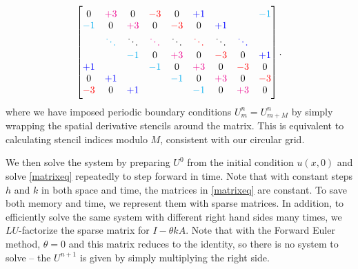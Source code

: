 \begin{equation*}
\begin{bmatrix}
0           & \color{magenta} +3      & 0           & \color{red} -3      & 0           & \color{blue} +1      &             &             & \color{cyan} -1      \\
\color{cyan} -1      & 0           & \color{magenta} +3      & 0           & \color{red} -3      & 0           & \color{blue} +1      &             &             \\
            & \color{cyan} \ddots  & \ddots      & \color{magenta} \ddots  & \ddots      & \color{red} \ddots  & \ddots      & \color{blue} \ddots  &             \\
            &             & \color{cyan} -1      & 0           & \color{magenta} +3      & 0           & \color{red} -3      & 0           & \color{blue} +1      \\
\color{blue} +1      &             &             & \color{cyan} -1      & 0           & \color{magenta} +3      & 0           & \color{red} -3      & 0           \\
0           & \color{blue} +1      &             &             & \color{cyan} -1      & 0           & \color{magenta} +3      & 0           & \color{red} -3      \\
\color{red} -3      & 0           & \color{blue} +1      &             &             & \color{cyan} -1      & 0           & \color{magenta} +3      & 0           \\
\end{bmatrix}
.
\end{equation*}
where we have imposed periodic boundary conditions $U_m^n = U_{m+M}^n$ by simply wrapping the spatial derivative stencils around the matrix.
This is equivalent to calculating stencil indices modulo $M$, consistent with our circular grid.

We then solve the system by preparing $U^0$ from the initial condition $u(x, 0)$ and solve \cref{matrixeq} repeatedly to step forward in time.
Note that with constant steps $h$ and $k$ in both space and time, the matrices in \cref{matrixeq} are constant.
To save both memory and time, we represent them with sparse matrices. \cite{scipy_sparse}
In addition, to efficiently solve the same system with different right hand sides many times, we $LU$-factorize the sparse matrix for $I - \theta k A$. \cite{scipy_sparse_lu}
Note that with the Forward Euler method, $\theta = 0$ and this matrix reduces to the identity, so there is no system to solve -- the $U^{n+1}$ is given by simply multiplying the right side.

